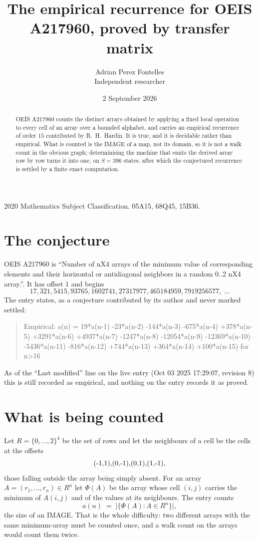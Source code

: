 \documentclass[11pt,a4paper]{article}
\title{The empirical recurrence for OEIS A217960, proved by transfer matrix}
\author{Adrian Perez Fontelles\\ \small Independent researcher}
\date{2 September 2026}
\theoremstyle{plain}
\theoremstyle{definition}
\begin{document}
\maketitle

\begin{abstract}
OEIS A217960 counts the distinct arrays obtained by applying a fixed local operation to every cell
of an array over a bounded alphabet, and carries an empirical recurrence of order $15$
contributed by R.~H.~Hardin. It is true, and it is decidable rather than empirical. What is
counted is the IMAGE of a map, not its domain, so it is not a walk count in the obvious graph;
determinising the machine that emits the derived array row by row turns it into one, on
$S=396$ states, after which the conjectured recurrence is settled by a finite exact
computation.
\end{abstract}

\noindent\small 2020 Mathematics Subject Classification. 05A15, 68Q45, 15B36.\normalsize

\section{The conjecture}

OEIS A217960 is ``Number of nX4 arrays of the minimum value of corresponding elements and their horizontal or antidiagonal neighbors in a random 0..2 nX4 array.''. It has offset $1$ and begins
\[
17, 321, 5415, 93765, 1602741, 27317977, 465184959, 7919256577,\ \dots
\]
The entry states, as a conjecture contributed by its author and never marked settled:
\begin{quote}
Empirical: a(n) = 19*a(n-1) -23*a(n-2) -144*a(n-3) -675*a(n-4) +378*a(n-5) +3291*a(n-6) +4937*a(n-7) -1247*a(n-8) -12054*a(n-9) -12369*a(n-10) -5436*a(n-11) -816*a(n-12) +744*a(n-13) +364*a(n-14) +100*a(n-15) for n>16
\end{quote}
As of the ``Last modified'' line on the live entry (Oct 03 2025 17:29:07, revision 8) this is still
recorded as empirical, and nothing on the entry records it as proved.

\section{What is being counted}

Let $R=\{0,\dots,2\}^{4}$ be the set of rows and let the neighbours of
a cell be the cells at the offsets
\[
$(-1,1)$, $(0,-1)$, $(0,1)$, $(1,-1)$,
\]
those falling outside the array being simply absent. For an array
$A=(r_1,\dots,r_n)\in R^n$ let $\Phi(A)$ be the array whose cell $(i,j)$ carries the
minimum of $A(i,j)$ and of the values at its neighbours. The entry counts
\[
a(n)\;=\;\bigl|\{\Phi(A):A\in R^n\}\bigr| ,
\]
the size of an IMAGE. That is the whole difficulty: two different arrays with the same
minimum-array must be counted once, and a walk count on the arrays would count them twice.
\end{document}
